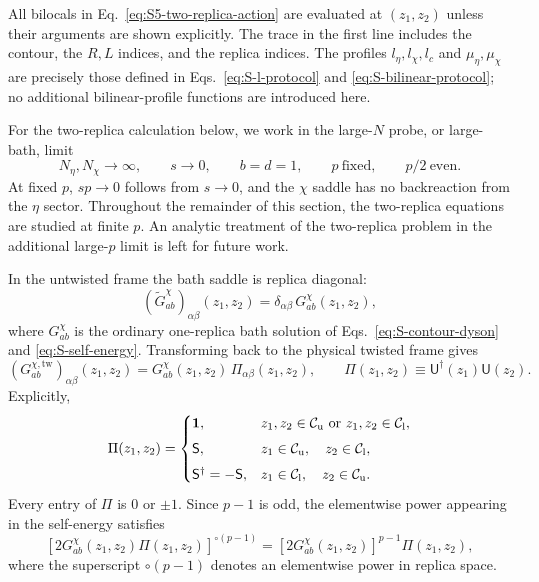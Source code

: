 \documentclass[11pt,a4paper]{article}
\begin{document}
All bilocals in Eq.~\eqref{eq:S5-two-replica-action} are evaluated at
\((z_1,z_2)\) unless their arguments are shown explicitly. The trace in the
first line includes the contour, the \(R,L\) indices, and the replica
indices. The profiles \(l_\eta,l_\chi,l_c\) and
\(\mu_\eta,\mu_\chi\) are precisely those defined in
Eqs.~\eqref{eq:S-l-protocol} and \eqref{eq:S-bilinear-protocol}; no additional
bilinear-profile functions are introduced here.

For the two-replica calculation below, we work in the large-\(N\)
probe, or large-bath, limit
\begin{equation}
  N_\eta,N_\chi\longrightarrow\infty,
  \qquad
  s\longrightarrow0,
  \qquad
  b=d=1,
  \qquad
  p\ \text{fixed},\qquad p/2\ \text{even}.
\label{eq:S5-finite-p-probe-limit}
\end{equation}
At fixed \(p\), \(sp\to0\) follows from \(s\to0\), and the \(\chi\) saddle
has no backreaction from the \(\eta\) sector. Throughout the remainder of
this section, the two-replica equations are studied at finite \(p\).
An analytic treatment of the two-replica problem in the additional
large-\(p\) limit is left for future work.

In the untwisted frame the bath saddle is replica diagonal:
\begin{equation}
  (\widetilde G^\chi_{ab})_{\alpha\beta}(z_1,z_2)
  =
  \delta_{\alpha\beta}\,
  G^\chi_{ab}(z_1,z_2),
\label{eq:S5-replica-diagonal-bath}
\end{equation}
where \(G^\chi_{ab}\) is the ordinary one-replica bath solution of
Eqs.~\eqref{eq:S-contour-dyson} and \eqref{eq:S-self-energy}. Transforming
back to the physical twisted frame gives
\begin{equation}
  (G^{\chi,\mathrm{tw}}_{ab})_{\alpha\beta}(z_1,z_2)
  =
  G^\chi_{ab}(z_1,z_2)\,
  \Pi_{\alpha\beta}(z_1,z_2),
  \qquad
  \Pi(z_1,z_2)
  \equiv
  \mathsf U^\dagger(z_1)\mathsf U(z_2).
\label{eq:S5-twist-kernel}
\end{equation}
Explicitly,
\begin{equation}
  \Pi(z_1,z_2)
  =
  \begin{cases}
    \mathbf 1,
    &z_1,z_2\in\mathcal C_{\rm u}
    \ \text{or}\
    z_1,z_2\in\mathcal C_{\rm l},
    \\[4pt]
    \mathsf S,
    &z_1\in\mathcal C_{\rm u},
    \quad
    z_2\in\mathcal C_{\rm l},
    \\[4pt]
    \mathsf S^\dagger=-\mathsf S,
    &z_1\in\mathcal C_{\rm l},
    \quad
    z_2\in\mathcal C_{\rm u}.
  \end{cases}
\label{eq:S5-twist-kernel-cases}
\end{equation}
Every entry of \(\Pi\) is \(0\) or \(\pm1\). Since \(p-1\) is odd,
the elementwise power appearing in the self-energy satisfies
\begin{equation}
  \left[
  2G^\chi_{ab}(z_1,z_2)
  \Pi(z_1,z_2)
  \right]^{\circ(p-1)}
  =
  \left[
  2G^\chi_{ab}(z_1,z_2)
  \right]^{p-1}
  \Pi(z_1,z_2),
\label{eq:S5-twist-power}
\end{equation}
where the superscript \(\circ(p-1)\) denotes an elementwise power in replica
space.
\end{document}
